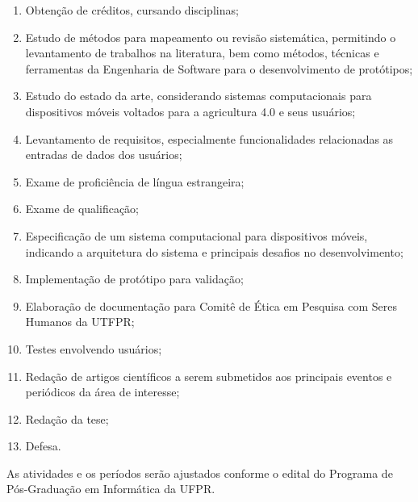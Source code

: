 \documentclass[12pt]{article}
\begin{document}
\begin{enumerate}
	\item Obtenção de créditos, cursando disciplinas;
	\item Estudo de métodos para mapeamento ou revisão sistemática, permitindo o levantamento de trabalhos na literatura, bem como métodos, técnicas e ferramentas da Engenharia de Software para o desenvolvimento de protótipos;
	\item Estudo do estado da arte, considerando sistemas computacionais para dispositivos móveis voltados para a agricultura 4.0 e seus usuários;
	\item Levantamento de requisitos, especialmente funcionalidades relacionadas as entradas de dados dos usuários;
	\item Exame de proficiência de língua estrangeira;
	\item Exame de qualificação;
	\item Especificação de um sistema computacional para dispositivos móveis, indicando a arquitetura do sistema e principais desafios no desenvolvimento;
	\item Implementação de protótipo para validação;
	\item Elaboração de documentação para Comitê de Ética em Pesquisa com Seres Humanos da UTFPR;
	\item Testes envolvendo usuários;
	\item Redação de artigos científicos a serem submetidos aos principais eventos e periódicos da área de interesse;
	\item Redação da tese;
	\item Defesa.
\end{enumerate}

As atividades e os períodos serão ajustados conforme o edital do Programa de Pós-Graduação em Informática da UFPR.
\end{document}
